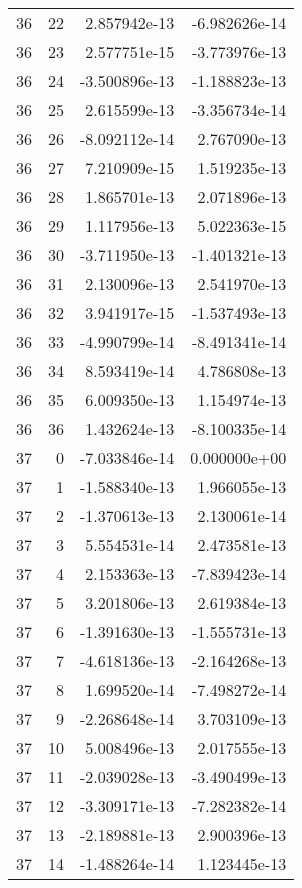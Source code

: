 \begin{tabular}{rrrr}
  36 &   22 &  2.857942e-13 & -6.982626e-14 \\
  36 &   23 &  2.577751e-15 & -3.773976e-13 \\
  36 &   24 & -3.500896e-13 & -1.188823e-13 \\
  36 &   25 &  2.615599e-13 & -3.356734e-14 \\
  36 &   26 & -8.092112e-14 &  2.767090e-13 \\
  36 &   27 &  7.210909e-15 &  1.519235e-13 \\
  36 &   28 &  1.865701e-13 &  2.071896e-13 \\
  36 &   29 &  1.117956e-13 &  5.022363e-15 \\
  36 &   30 & -3.711950e-13 & -1.401321e-13 \\
  36 &   31 &  2.130096e-13 &  2.541970e-13 \\
  36 &   32 &  3.941917e-15 & -1.537493e-13 \\
  36 &   33 & -4.990799e-14 & -8.491341e-14 \\
  36 &   34 &  8.593419e-14 &  4.786808e-13 \\
  36 &   35 &  6.009350e-13 &  1.154974e-13 \\
  36 &   36 &  1.432624e-13 & -8.100335e-14 \\
  37 &    0 & -7.033846e-14 &  0.000000e+00 \\
  37 &    1 & -1.588340e-13 &  1.966055e-13 \\
  37 &    2 & -1.370613e-13 &  2.130061e-14 \\
  37 &    3 &  5.554531e-14 &  2.473581e-13 \\
  37 &    4 &  2.153363e-13 & -7.839423e-14 \\
  37 &    5 &  3.201806e-13 &  2.619384e-13 \\
  37 &    6 & -1.391630e-13 & -1.555731e-13 \\
  37 &    7 & -4.618136e-13 & -2.164268e-13 \\
  37 &    8 &  1.699520e-14 & -7.498272e-14 \\
  37 &    9 & -2.268648e-14 &  3.703109e-13 \\
  37 &   10 &  5.008496e-13 &  2.017555e-13 \\
  37 &   11 & -2.039028e-13 & -3.490499e-13 \\
  37 &   12 & -3.309171e-13 & -7.282382e-14 \\
  37 &   13 & -2.189881e-13 &  2.900396e-13 \\
  37 &   14 & -1.488264e-14 &  1.123445e-13 \\

\end{tabular}

